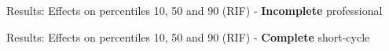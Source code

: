 \documentclass[11pt, aspectratio=169]{beamer}
\begin{document}
\begin{frame}{Results: Effects on percentiles 10, 50 and 90 (RIF) - \textbf{Incomplete} professional}
    \centering
\end{frame}


\begin{frame}{Results: Effects on percentiles 10, 50 and 90 (RIF) - \textbf{Complete} short-cycle}
    \centering
\end{frame}
\end{document}
